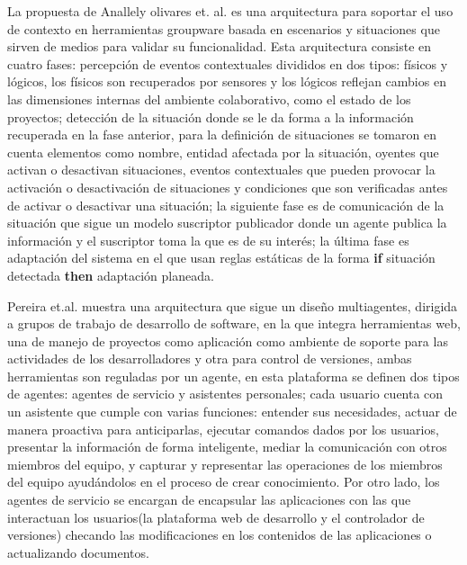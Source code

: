 La propuesta de Anallely olivares et. al. \cite{olivares2011} es una arquitectura para soportar el uso de contexto en herramientas groupware basada en escenarios y situaciones que sirven de medios para validar su funcionalidad. Esta arquitectura consiste en cuatro fases: percepci\'on de eventos contextuales divididos en dos tipos: f\'isicos y l\'ogicos, los f\'isicos son recuperados por sensores y los l\'ogicos reflejan cambios en las dimensiones internas del ambiente colaborativo, como el estado de los proyectos; detecci\'on de la situaci\'on donde se le da forma a la informaci\'on recuperada en la fase anterior, para la definici\'on de situaciones se tomaron en cuenta elementos como nombre, entidad afectada por la situaci\'on, oyentes que activan o desactivan situaciones, eventos contextuales que pueden provocar la activaci\'on o desactivaci\'on de situaciones y condiciones que son verificadas antes de activar o desactivar una situaci\'on; la siguiente fase es de comunicaci\'on de la situaci\'on que sigue un modelo suscriptor publicador donde un agente publica la informaci\'on y el suscriptor toma la que es de su inter\'es; la \'ultima fase es adaptaci\'on del sistema en el que usan reglas est\'aticas de la forma \textbf{if} situaci\'on detectada \textbf{then} adaptaci\'on planeada.

Pereira et.al. \cite{pereira2013CSCWD} muestra una arquitectura que sigue un dise\~no multiagentes, dirigida a grupos de trabajo de desarrollo de software, en la que integra herramientas web, una de manejo de proyectos como aplicaci\'on como ambiente de soporte para las actividades de los desarrolladores y otra para control de versiones, ambas herramientas son reguladas por un agente, en esta plataforma se definen dos tipos de agentes: agentes de servicio y asistentes personales; cada usuario cuenta con un asistente que cumple con varias funciones: entender sus necesidades, actuar de manera proactiva para anticiparlas, ejecutar comandos dados por los usuarios, presentar la informaci\'on de forma inteligente, mediar la comunicaci\'on con otros miembros del equipo, y capturar y representar las operaciones de los miembros del equipo ayud\'andolos en el proceso de crear conocimiento. Por otro lado, los agentes de servicio se encargan de encapsular las aplicaciones con las que interactuan los usuarios(la plataforma web de desarrollo y el controlador de versiones) checando las modificaciones en los contenidos de las aplicaciones o actualizando documentos.

